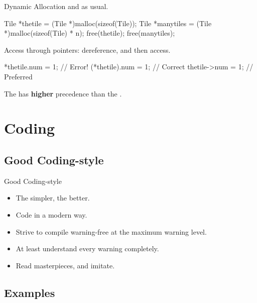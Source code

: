 \documentclass{beamer}
\begin{document}
\begin{frame}[fragile]{Dynamic Allocation}
     and  as usual.
    \begin{cpp}
Tile *thetile
  = (Tile *)malloc(sizeof(Tile));
Tile *manytiles
  = (Tile *)malloc(sizeof(Tile) * n);
free(thetile); free(manytiles);
    \end{cpp}
    \pause
    Access through pointers: dereference, and then access.
    \begin{cpp}
*thetile.num = 1;   // Error!
(*thetile).num = 1; // Correct
thetile->num = 1;   // Preferred
    \end{cpp}
    \begin{rmk}
        The  has \textbf{higher} precedence than the .
    \end{rmk}
\end{frame}

\section{Coding}

\subsection{Good Coding-style}

\begin{frame}{Good Coding-style}
    \begin{itemize}
        \item The simpler, the better.
        \item Code in a modern way.
        \item Strive to compile warning-free at the maximum warning level.
        \item At least understand every warning completely.
        \item Read masterpieces, and imitate.
    \end{itemize}
\end{frame}

\subsection{Examples}
\end{document}
